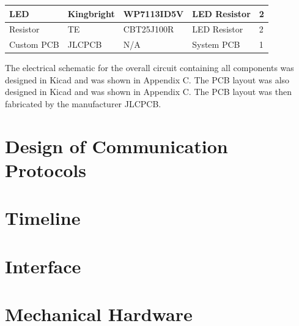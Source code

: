 \documentclass[12pt, titlepage]{article}
\begin{document}
\begin{table}[H]
\begin{tabular}{|p{3cm}|p{2cm}|p{4cm}|p{4cm}|p{2cm}|}
  LED                                
  & Kingbright
  & WP7113ID5V
  & LED Resistor
  & 2
  \newline                            
  \\ \hline

  Resistor                                
  & TE
  & CBT25J100R
  & LED Resistor
  & 2
  \newline                            
  \\ \hline

  Custom PCB                                
  & JLCPCB
  & N/A
  & System PCB
  & 1
  \newline                            
  \\ \hline

  \end{tabular}
\end{table}

The electrical schematic for the overall circuit containing all components was designed in Kicad and was shown in Appendix C. The PCB layout was also designed in Kicad and was shown in Appendix C. The PCB layout was then fabricated by the manufacturer JLCPCB. \\

\newpage




\section{Design of Communication Protocols}


\section{Timeline}


% 

\newpage{}

\appendix

\section{Interface}


\section{Mechanical Hardware}
\end{document}
